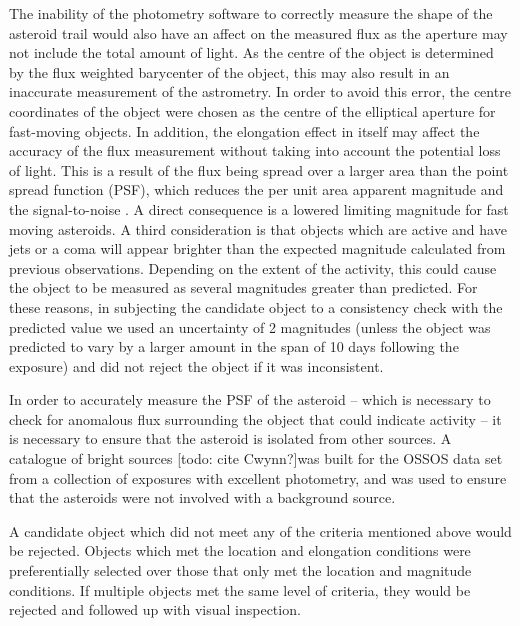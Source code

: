 \documentclass[iop,apj]{emulateapj}
\begin{document}
The inability of the photometry software to correctly measure the shape of the asteroid trail would also have an affect on the measured flux as the aperture may not include the total amount of light. As the centre of the object is determined by the flux weighted barycenter of the object, this may also result in an inaccurate measurement of the astrometry. In order to avoid this error, the centre coordinates of the object were chosen as the centre of the elliptical aperture for fast-moving objects. 
In addition, the elongation effect in itself may affect the accuracy of the flux measurement without taking into account the potential loss of light. This is a result of the flux being spread over a larger area than the point spread function (PSF), which reduces the per unit area apparent magnitude and the signal-to-noise \citep{veres12}. A direct consequence is a lowered limiting magnitude for fast moving asteroids. 
A third consideration is that objects which are active and have jets or a coma will appear brighter than the expected magnitude calculated from previous observations. Depending on the extent of the activity, this could cause the object to be measured as several magnitudes greater than predicted. For these reasons, in subjecting the candidate object to a consistency check with the predicted value we used an uncertainty of 2 magnitudes (unless the object was predicted to vary by a larger amount in the span of 10 days following the exposure) and did not reject the object if it was inconsistent.

In order to accurately measure the PSF of the asteroid -- which is necessary to check for anomalous flux surrounding the object that could indicate activity -- it is necessary to ensure that the asteroid is isolated from other sources. A catalogue of bright sources [todo: cite Cwynn?]was built for the OSSOS data set from a collection of exposures with excellent photometry, and was used to ensure that the asteroids were not involved with a background source.


A candidate object which did not meet any of the criteria mentioned above would be rejected. Objects which met the location and elongation conditions were preferentially selected over those that only met the location and magnitude conditions. If multiple objects met the same level of criteria, they would be rejected and followed up with visual inspection.
\end{document}
